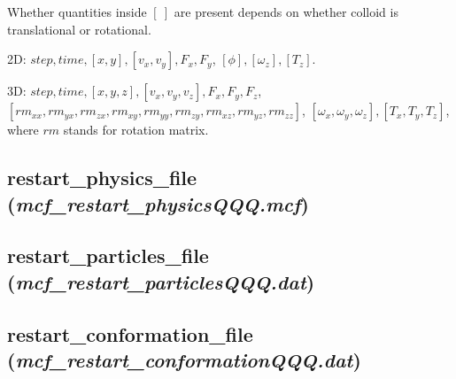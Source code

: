 \documentclass[a4paper,10pt]{article}
\begin{document}
Whether quantities inside $[~]$ are present depends
on whether colloid is translational or rotational.

2D:
\textbf{$step, time, [x, y], [v_x, v_y],
F_x, F_y$},
\textbf{$[\phi],[\omega_z], 
[T_z]$}.

3D:
\textbf{$step, time, [x, y, z], [v_x, v_y, v_z],
F_x, F_y, F_z$},\\
\textbf{$[rm_{xx},rm_{yx},rm_{zx},rm_{xy},rm_{yy},rm_{zy},rm_{xz},rm_{yz},rm_{zz}]$},
\textbf{$[\omega_x, \omega_y, \omega_z],[T_x, T_y, T_z]$},
where $rm$ stands for rotation matrix.

\subsection{\textbf{restart\_physics\_file}\\
(\textit{mcf\_restart\_physicsQQQ.mcf})}


\subsection{\textbf{restart\_particles\_file}\\
(\textit{mcf\_restart\_particlesQQQ.dat})}


\subsection{\textbf{restart\_conformation\_file}\\
(\textit{mcf\_restart\_conformationQQQ.dat})}



\end{document}
